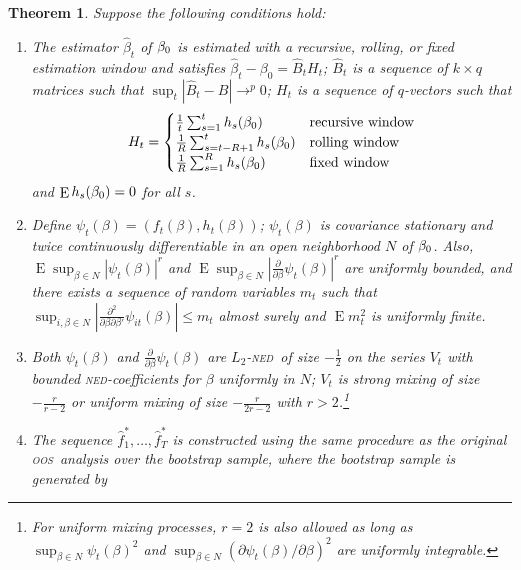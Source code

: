 \documentclass[11pt,fleqn]{article}
\newtheorem{thm}{Theorem}
\theoremstyle{definition}
\DeclareMathOperator{\E}{E}
\newcommand{\btrue}[1][]{\if#1*\hat\beta_{T+1}\else\beta_0\fi}
\newcommand{\ned}{\textsc{ned}}
\newcommand{\oos}{\textsc{oos}}
\begin{document}
\begin{thm}\label{res:3}
  Suppose the following conditions hold:
  \begin{enumerate}
  \item The estimator $\hat{\beta}_t$ of $\btrue$ is estimated with a
    recursive, rolling, or fixed estimation window and satisfies
    $\hat{\beta}_{t} - \beta_{0} = \hat{B}_{t} H_t$; $\hat{B}_{t}$ is
    a sequence of $k \times q$ matrices such that $\sup_t |\hat{B}_t -
    B| \to^p 0$; $H_{t}$ is a sequence of $q$-vectors such that
    \begin{equation}
      H_{t} = \begin{cases} 
        \tfrac1t \sum_{s=1}^t h_{s}(\btrue) & \text{recursive window} \\
        \tfrac1R \sum_{s=t-R+1}^t h_{s}(\btrue) & \text{rolling window} \\
        \tfrac1R \sum_{s=1}^R h_{s}(\btrue) & \text{fixed window} \\
      \end{cases}
    \end{equation}
    and $\E h_{s}(\btrue) = 0$ for all $s$.
  \item Define $\psi_t(\beta) = (f_t(\beta), h_t(\beta))$;
    $\psi_t(\beta)$ is covariance stationary and twice continuously
    differentiable in an open neighborhood $N$ of $\btrue$.  Also,
    $\E \sup_{\beta \in N} |\psi_t(\beta)|^r$ and $\E\sup_{\beta \in
      N} |\frac{\partial}{\partial \beta} \psi_t(\beta)|^r$ are
    uniformly bounded, and there exists a sequence of random variables
    $m_t$ such that $\sup_{i,\beta \in N} |\tfrac{\partial^2}{\partial
      \beta \partial \beta'} \psi_{it}(\beta)| \leq m_t$ almost surely
    and $\E m_t^2$ is uniformly finite.
  \item Both $\psi_t(\beta)$ and $\frac{\partial}{\partial \beta}
    \psi_t(\beta)$ are $L_2$-\ned\ of size $-\frac12$ on the
    series $V_t$ with bounded \ned-coefficients for $\beta$ uniformly
    in $N$; $V_t$ is strong mixing of size $-\frac{r}{r-2}$ or uniform
    mixing of size $-\frac{r}{2r-2}$ with $r > 2$.\footnote{For
      uniform mixing processes, $r = 2$ is also allowed as long as
      $\sup_{\beta \in N} \psi_t(\beta)^2$ and $\sup_{\beta \in N}
      (\partial \psi_t(\beta) / \partial \beta)^2$ are uniformly
      integrable.}
  \item The sequence $\hat f_1^{*},\dots,\hat f_T^{*}$ is constructed
    using the same procedure as the original \oos\ analysis over the
    bootstrap sample, where the bootstrap sample is generated by

\end{enumerate}
\end{thm}
\end{document}
